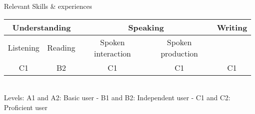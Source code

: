 \documentclass{resume} %
\begin{document}
\begin{rSection}{ Relevant Skills \& experiences}
	\begin{tabular}{@{}|c|c|c|c|c@{}}
		\toprule
		\multicolumn{2}{|c|}{Understanding} & \multicolumn{2}{c|}{Speaking}          & Writing                 \\ \midrule
		Listening         & Reading         & Spoken interaction & Spoken production & \multicolumn{1}{c|}{}   \\ \midrule
		C1                & B2              & C1                 & C1                & \multicolumn{1}{c|}{C1} \\ \bottomrule
	\end{tabular}
    \\\tiny Levels: A1 and A2: Basic user - B1 and B2: Independent user - C1 and C2: Proficient user \normalfont \\ 

\end{rSection}
\end{document}
